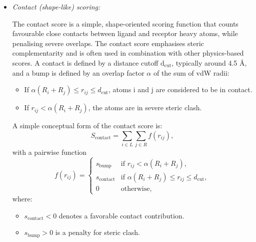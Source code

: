 \documentclass[12pt]{article}
\begin{document}
\begin{itemize}
Here $\textrm{A}_\textrm{i}$ and $\textrm{B}_\textrm{i}$ are ligand atomic parameters, and the pre-computed receptor sums $\textrm{G}^\textrm{(n)}_\textrm{k}$, $\textrm{G}^\textrm{(m)}_\textrm{k}$, and
$\textrm{G}^{(\textrm{es})}_\textrm{k}$ are read from the energy grid files. This reduces the computational complexity from $O(N_L N_R)$ for a double sum to $O(N_L)$ for a sum over ligand atoms, where $\textrm{N}_\textrm{L}$ and $\textrm{N}_\textrm{R}$ are the numbers of ligand and receptor atoms, respectively.

\item \emph{Contact (shape-like) scoring:}

The contact score is a simple, shape-oriented scoring function that counts favourable close contacts between ligand and receptor heavy atoms, while penalising severe overlaps. The contact score emphasises steric complementarity and is often used in combination with other physics-based scores. A contact is defined by a distance cutoff $\textrm{d}_{\textrm{cut}}$, typically around 4.5 \r{A}, and a bump is defined by an overlap factor $\alpha$ of the sum of vdW radii:

\begin{itemize}
  \item If $\alpha (R_i + R_j) \le r_{ij} \le d_{\textrm{cut}}$, atoms i and j are considered to be in contact.
  \item If $r_{ij} < \alpha (R_i + R_j)$, the atoms are in severe steric clash.
\end{itemize}

A simple conceptual form of the contact score is:
\begin{equation}
  S_{\text{contact}} =
    \sum_{i \in L} \sum_{j \in R} f(r_{ij}),
\end{equation}
with a pairwise function
\begin{equation}
  f(r_{ij}) =
  \begin{cases}
    s_{\text{bump}} &
      \text{if } r_{ij} < \alpha (R_i + R_j), \\
    s_{\text{contact}} &
      \text{if } \alpha (R_i + R_j) \le r_{ij} \le d_{\text{cut}}, \\
    0 & \text{otherwise},
  \end{cases}
\end{equation}
where:
\begin{itemize}
  \item \(s_{\text{contact}} < 0\) denotes a favorable contact contribution.
  \item \(s_{\text{bump}} > 0\) is a penalty for steric clash.
\end{itemize}



\end{itemize}
\end{document}

